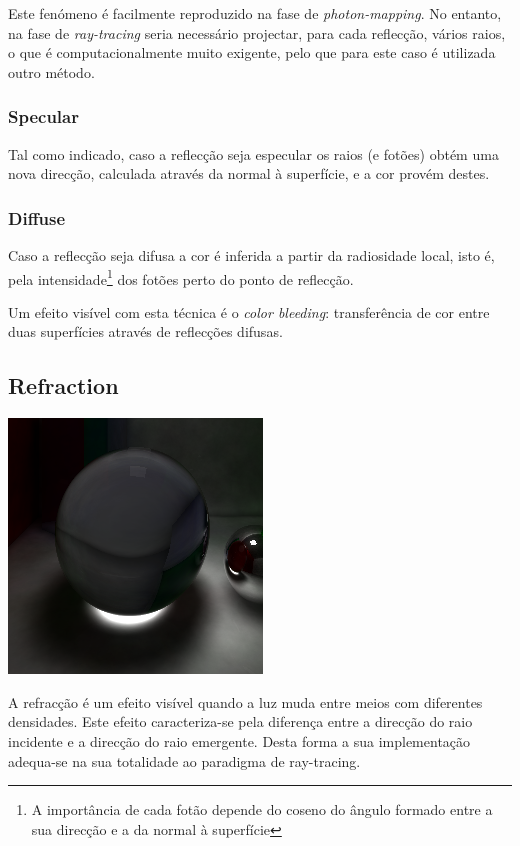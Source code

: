\documentclass[a4paper]{article}
\begin{document}
\indent Este fenómeno é facilmente reproduzido na fase de \emph{photon-mapping}.
No entanto, na fase de \emph{ray-tracing} seria necessário projectar, para cada reflecção, vários raios, o que
é computacionalmente muito exigente, pelo que para este caso é utilizada outro método.

\subsubsection{Specular}
\indent \indent Tal como indicado, caso a reflecção seja especular os raios (e fotões) obtém uma nova direcção,
calculada através da normal à superfície, e a cor provém destes. 

\subsubsection{Diffuse}
\indent Caso a reflecção seja difusa a cor é inferida a partir da radiosidade local,
isto é, pela intensidade\footnote[1]{A importância de cada fotão depende do coseno do ângulo formado entre a sua direcção e a da normal à superfície} dos fotões perto do ponto de reflecção.

\indent Um efeito visível com esta técnica é o \emph{color bleeding}: transferência de cor entre duas superfícies
através de reflecções difusas.

\cleardoublepage
\subsection{Refraction}
\begin{center}
	\includegraphics[scale=0.50]{images/caustics.png}
	\label{fig:caustics}
\end{center}

\indent A refracção é um efeito visível quando a luz muda entre meios com diferentes densidades.
Este efeito caracteriza-se pela diferença entre a direcção do raio incidente e a direcção do raio emergente. 
Desta forma a sua implementação adequa-se na sua totalidade ao paradigma de ray-tracing.
\end{document}
